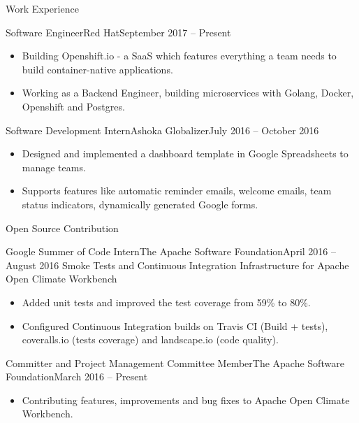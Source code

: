 \documentclass[]{mcdowellcv}
\begin{document}
	\makeheader
	\begin{cvsection}{Work Experience}
		\begin{cvsubsection}{Software Engineer}{Red Hat}{September 2017 -- Present}
			\begin{itemize}
				\item Building Openshift.io - a SaaS which features everything a team needs to build container-native applications.
				\item Working as a Backend Engineer, building microservices with Golang, Docker, Openshift and Postgres.
			\end{itemize}
		\end{cvsubsection}
		\begin{cvsubsection}{Software Development Intern}{Ashoka Globalizer}{July 2016 -- October 2016}
			\begin{itemize}
				\item Designed and implemented a dashboard template in Google Spreadsheets to manage teams.
				\item Supports features like automatic reminder emails, welcome emails, team status indicators, dynamically generated Google forms.
			\end{itemize}
		\end{cvsubsection}
	\end{cvsection}
	\begin{cvsection}{Open Source Contribution}
		\begin{cvsubsection}[2]{Google Summer of Code Intern}{The Apache Software Foundation}{April 2016 -- August 2016}
			Smoke Tests and Continuous Integration Infrastructure for Apache Open Climate Workbench
			\begin{itemize}
				\item Added unit tests and improved the test coverage from 59\% to 80\%.
				\item Configured Continuous Integration builds on Travis CI (Build + tests), coveralls.io (tests coverage) and landscape.io (code quality).
			\end{itemize}
		\end{cvsubsection}
		\begin{cvsubsection}[2]{Committer and Project Management Committee Member}{The Apache Software Foundation}{March 2016 -- Present}
			\begin{itemize}
				\item Contributing features, improvements and bug fixes to Apache Open Climate Workbench.
			\end{itemize}
		\end{cvsubsection}
	\end{cvsection}
\end{document}
